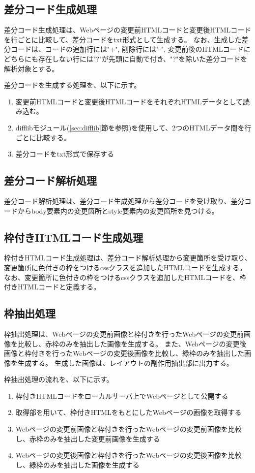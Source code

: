 \subsection{差分コード生成処理}\label{subsec:diff_file_generate}
差分コード生成処理は、Webページの変更前HTMLコードと変更後HTMLコードを行ごとに比較して、差分コードをtxt形式として生成する。
なお、生成した差分コードは、コードの追加行には"+", 削除行には"-", 変更前後のHTMLコードにどちらにも存在しない行には"?"が先頭に自動で付き、"?"を除いた差分コードを解析対象とする。
\par
差分コードを生成する処理を、以下に示す。
\begin{enumerate}
    \item 変更前HTMLコードと変更後HTMLコードをそれぞれHTMLデータとして読み込む。
    \item difflibモジュール(\ref{sec:difflib}節を参照)を使用して、2つのHTMLデータ間を行ごとに比較する。
    \item 差分コードをtxt形式で保存する
\end{enumerate}

\subsection{差分コード解析処理}\label{subsec:diff_file_analyze}
差分コード解析処理は、差分コード生成処理から差分コードを受け取り、差分コードからbody要素内の変更箇所とstyle要素内の変更箇所を見つける。

\subsection{枠付きHTMLコード生成処理}\label{subsec:modified_html_generate}
枠付きHTMLコード生成処理は、差分コード解析処理から変更箇所を受け取り、変更箇所に色付きの枠をつけるcssクラスを追加したHTMLコードを生成する。
なお、変更箇所に色付きの枠をつけるcssクラスを追加したHTMLコードを、枠付きHTMLコードと定義する。

\subsection{枠抽出処理}\label{subsec:frame_extraction}
枠抽出処理は、Webページの変更前画像と枠付きを行ったWebページの変更前画像を比較し、赤枠のみを抽出した画像を生成する。
また、Webページの変更後画像と枠付きを行ったWebページの変更後画像を比較し、緑枠のみを抽出した画像を生成する。
生成した画像は、レイアウトの副作用抽出部に出力する。
\par
枠抽出処理の流れを、以下に示す。
\begin{enumerate}
    \item 枠付きHTMLコードをローカルサーバ上でWebページとして公開する
    \item 取得部を用いて、枠付きHTMLをもとにしたWebページの画像を取得する
    \item Webページの変更前画像と枠付きを行ったWebページの変更前画像を比較し、赤枠のみを抽出した変更前画像を生成する
    \item Webページの変更後画像と枠付きを行ったWebページの変更後画像を比較し、緑枠のみを抽出した画像を生成する
\end{enumerate}

